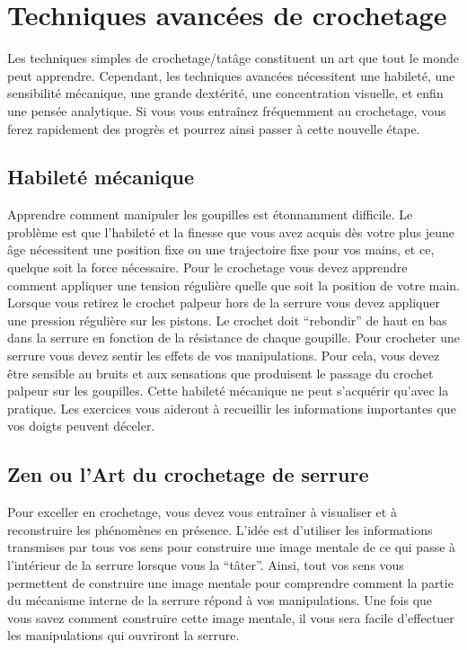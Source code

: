\documentclass[a4paper,french,11pt,twoside]{report}
\begin{document}
\chapter{\label{chap:techniques_avancees}Techniques avancées de crochetage}

Les techniques simples de crochetage/tatâge constituent un art que tout le monde peut apprendre. Cependant, les techniques avancées nécessitent une habileté, une sensibilité mécanique, une grande dextérité, une concentration visuelle, et enfin une pensée analytique. Si vous vous entraînez fréquemment au crochetage, vous ferez rapidement des progrès et pourrez ainsi passer à cette nouvelle étape.

\section{Habileté mécanique}

Apprendre comment manipuler les goupilles est étonnamment difficile. Le problème est que l'habileté et la finesse que vous avez acquis dès votre plus jeune âge nécessitent une position fixe ou une trajectoire fixe pour vos mains, et ce, quelque soit la force nécessaire. Pour le crochetage vous devez apprendre comment appliquer une tension régulière quelle que soit la position de votre main. Lorsque vous retirez le crochet palpeur hors de la serrure vous devez appliquer une pression régulière sur les pistons. Le crochet doit \enquote{rebondir} de haut en bas dans la serrure en fonction de la résistance de chaque goupille.
Pour crocheter une serrure vous devez sentir les effets de vos manipulations. Pour cela, vous devez être sensible au bruits et aux sensations que produisent le passage du crochet palpeur sur les goupilles. Cette habileté mécanique ne peut s'acquérir qu'avec la pratique. Les exercices vous aideront à recueillir les informations importantes que vos doigts peuvent déceler.

\section{Zen ou l'Art du crochetage de serrure}

Pour exceller en crochetage, vous devez vous entraîner à visualiser et à reconstruire les phénomènes en présence. L'idée est d'utiliser les informations transmises par tous vos sens pour construire une image mentale de ce qui passe à l'intérieur de la serrure lorsque vous la \enquote{tâter}. Ainsi, tout vos sens vous permettent de construire une image mentale pour comprendre comment la partie du mécanisme interne de la serrure répond à vos manipulations. Une fois que vous savez comment construire cette image mentale, il vous sera facile d'effectuer les manipulations qui ouvriront la serrure.
\end{document}
